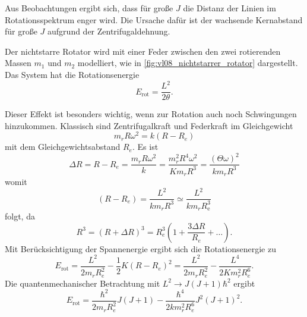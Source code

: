 	Aus Beobachtungen ergibt sich, dass für große $J$ die Distanz der Linien im Rotationsspektrum enger wird. Die Ursache dafür ist der wachsende Kernabstand für große $J$ aufgrund der Zentrifugaldehnung.\\

	\begin{minipage}{0.35\linewidth}
		Der nichtstarre Rotator wird mit einer Feder zwischen den zwei rotierenden Massen $m_1$ und $m_2$ modelliert, wie in \autoref{fig:vl08_nichtstarrer_rotator} dargestellt. Das System hat die Rotationsenergie
		$$
		E_{\text{rot}} = \frac{L^2}{2 \theta}.
		$$ 
	\end{minipage}
	\hfill
	\begin{minipage}{0.6\linewidth}
		\centering
		\label{fig:vl08_nichtstarrer_rotator}
	\end{minipage}

	Dieser Effekt ist besonders wichtig, wenn zur Rotation auch noch Schwingungen hinzukommen. 
	Klassisch sind Zentrifugalkraft und Federkraft im Gleichgewicht
	\begin{equation}
		\label{eq:4.22}
		m_{r}R \omega^2 = k\left( R-R_{e} \right) 
	\end{equation}
	mit dem Gleichgewichtsabstand $R_e$. Es ist
	\begin{equation}
		\label{eq:4.23}
		\Delta R = R - R_{e} = \frac{m_{r} R \omega^2}{k} = \frac{m_{r}^2 R^{4} \omega^2}{K m_{r} R^3} = \frac{\left( \Theta \omega \right) ^2}{k m_{r} R^3} 
	\end{equation}
	womit
	\begin{equation}
		\label{eq:4.24}
		(R - R_{e} ) = \frac{L^2}{k m_{r} R^3} \simeq \frac{L^2}{km_{r} R_\mathrm{e}^3}		
	\end{equation}
	folgt, da
	$$
	R^3 = (R + \Delta R)^3 = R_{e} ^3 \left( 1 + \frac{ 3 \Delta R}{R_{e}}+ \ldots \right).
	$$  
	Mit Berücksichtigung der Spannenergie ergibt sich die Rotationsenergie zu
	$$
	E_{\text{rot}} = \frac{L^2}{2m_{r} R_{e}^2} - \frac{1}{2} K\left( R - R_{e} \right) ^2 = \frac{L^2}{2 m_{r} R_{e}^2} - \frac{L^{4}}{2Km_{r}^2 R_{e}^{6}}.
	$$ 
	Die quantenmechanischer Betrachtung mit $L^2 \to J(J+1) \hbar ^2$ ergibt
	\begin{equation}
		\label{eq:4.27}
		E_{\text{rot}} = \frac{\hbar ^2}{2 m_{r}R_{e}^2} J\left( J+1 \right) - \frac{\hbar ^{4}}{2 k m_{r}^2 R_{e}^{6}} J^2\left( J+1 \right) ^2.
	\end{equation}

